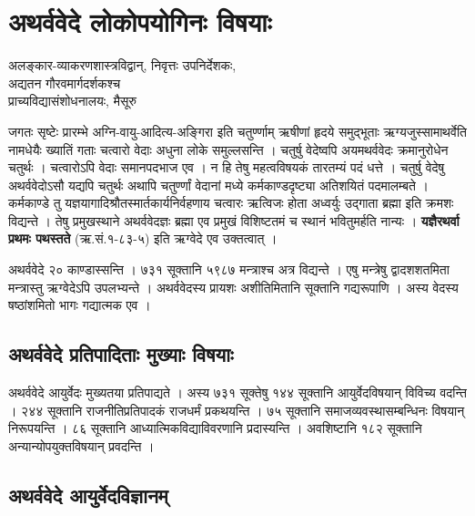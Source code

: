 \chapter{अथर्ववेदे लोकोपयोगिनः विषयाः}

\begin{center}
\smallskip
 
अलङ्कार-व्याकरणशास्त्रविद्वान्, निवृत्तः उपनिर्देशकः,\\ 
अद्यतन गौरवमार्गदर्शकश्च\\
प्राच्यविद्यासंशोधनालयः, मैसूरु
\end{center}

जगतः सृष्टेः प्रारम्भे अग्नि-वायु-आदित्य-अङ्गिरा इति चतुर्ण्णाम् ऋषीणां हृदये समुद्भूताः ऋग्यजुस्सामाथर्वेति नामधेयैः ख्यातिं गताः चत्वारो वेदाः अधुना लोके समुल्लसन्ति । चतुर्षु वेदेष्वपि अयमथर्ववेदः क्रमानुरोधेन चतुर्थः । चत्वारोऽपि वेदाः समानपदभाज एव । न हि तेषु महत्वविषयकं तारतम्यं पदं धत्ते । चतुर्षु वेदेषु अथर्ववेदोऽसौ यद्यपि चतुर्थः अथापि चतुर्ण्णां वेदानां मध्ये कर्मकाण्डदृष्ट्या अतिशयितं पदमालम्बते । कर्मकाण्डे तु यज्ञयागादिश्रौतस्मार्तकार्यनिर्वहणाय चत्वारः ऋत्विजः होता अध्वर्युः उद्गाता ब्रह्मा इति क्रमशः विद्यन्ते । तेषु प्रमुखस्थाने अथर्ववेदज्ञः ब्रह्मा एव प्रमुखं विशिष्टतमं च स्थानं भवितुमर्हति नान्यः । \textbf{यज्ञैरथर्वा प्रथमः पथस्तते} (ऋ.सं.१-८३-५) इति ऋग्वेदे एव उक्तत्वात् ।

अथर्ववेदे २० काण्डास्सन्ति । ७३१ सूक्तानि ५९८७ मन्त्राश्च अत्र विद्यन्ते । एषु मन्त्रेषु द्वादशशतमिता मन्त्रास्तु ऋग्वेदेऽपि उपलभ्यन्ते । अथर्ववेदस्य प्रायशः अशीतिमितानि सूक्तानि गद्यरूपाणि । अस्य वेदस्य षष्ठांशमितो भागः गद्यात्मक एव ।

\section*{अथर्ववेदे प्रतिपादिताः मुख्याः विषयाः}

अथर्ववेदे आयुर्वेदः मुख्यतया प्रतिपाद्यते । अस्य ७३१ सूक्तेषु १४४ सूक्तानि आयुर्वेदविषयान् विविच्य वदन्ति । २४४ सूक्तानि राजनीतिप्रतिपादकं राजधर्मं प्रकथयन्ति । ७५ सूक्तानि समाजव्यवस्थासम्बन्धिनः विषयान् निरूपयन्ति । ८६ सूक्तानि आध्यात्मिकविद्याविवरणानि प्रदास्यन्ति । अवशिष्टानि १८२ सूक्तानि अन्यान्योपयुक्तविषयान् प्रवदन्ति ।

\section*{अथर्ववेदे आयुर्वेदविज्ञानम्}

